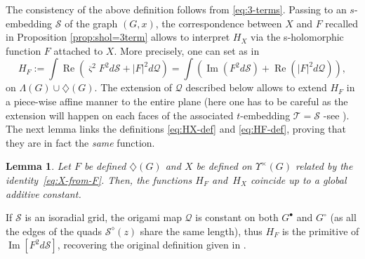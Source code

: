 \documentclass[reqno]{amsart}
\numberwithin{equation}{section}
\newtheorem{lemma}[theo]{Lemma}
\theoremstyle{definition}
\theoremstyle{remark}
\renewcommand\Re{\operatorname{Re}}
\renewcommand\Im{\operatorname{Im}}
\newcommand\cQ{\mathcal{Q}}
\newcommand\cS{\mathcal{S}}
\newcommand\cT{\mathcal{T}}
\newcommand\Dm{\diamondsuit}
\begin{document}
The consistency of the above definition follows from \eqref{eq:3-terms}. Passing to an $s$-embedding $\cS$ of the graph $(G,x)$, the correspondence between $X$ and $F$ recalled in Proposition \ref{prop:shol=3term} allows to interpret $H_{X}$ via the s-holomorphic function $F$ attached to $X$. More precisely, one can set as in \cite[Equation (2.17)]{Che20}
\begin{equation}
\label{eq:HF-def}
H_F:=\int\Re(\overline{\varsigma}^2F^2d\cS+|F|^2d\cQ)=\int (\Im(F^2d\cS)+\Re(|F|^2d\cQ)),
\end{equation}
on $\Lambda(G)\cup\Dm(G)$. The extension of $\cQ$ described below allows to extend  $H_F$ in a piece-wise affine manner to the entire plane (here one has to be careful as the extension will happen on each faces of the associated $t$-embedding $\cT=\cS$ -see \cite[Proposition 3.10]{CLR1}). The next lemma links the definitions \eqref{eq:HX-def} and \eqref{eq:HF-def}, proving that they are in fact the \emph{same} function.

\begin{lemma}{\cite[Lemma 2.9]{Che20}} Let $F$ be defined $\Dm(G)$ and $X$ be defined on $\Upsilon^\times(G)$ related by the identity~\eqref{eq:X-from-F}. Then, the functions $H_F$ and~$H_X$ coincide up to a global additive constant.
\end{lemma}
If $\cS $ is an isoradial grid, the origami map $\cQ$ is constant on both $G^\bullet$ and $G^\circ$ (as all the edges of the quads $\cS^{\diamond}(z) $ share the same length), thus $H_F$ is the primitive of $\Im[F^2d\cS]$, recovering the  original definition given in \cite[Section~3.3]{ChSmi2}. 
\end{document}
